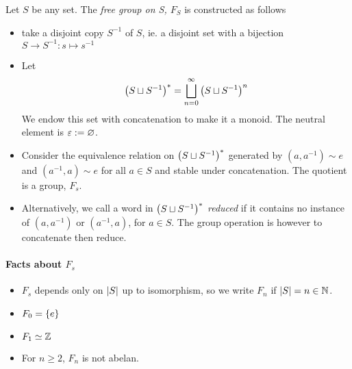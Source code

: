     \begin{definition}
        Let $S$ be any set. The \emph{free group on S, $F_S$} is 
        constructed as follows
        \begin{itemize}
            \item take a disjoint copy $S^{-1}$ of $S$,
                ie. a disjoint set with a bijection $S \to S^{-1}: s \mapsto s^{-1}$
            \item Let \[
                \left(S \sqcup S^{-1}\right)^* = \bigsqcup_{n = 0}^\infty
                    \left(S \sqcup S^{-1}\right)^n
                \]
                We endow this set with concatenation to make it a monoid.
                The neutral element is $\varepsilon := \varnothing$.
            \item Consider the equivalence relation on 
                $\left(S \sqcup S^{-1}\right)^*$ generated by $(a, a^{-1}) \sim e$
                and $(a^{-1}, a) \sim e$
                for all $a \in S$ and stable under concatenation.
                The quotient is a group, $F_s$.
            \item Alternatively, we call a word in $\left(S \sqcup S^{-1}\right)^*$
                \emph{reduced} if it contains no instance of $(a, a^{-1})$ or 
                $(a^{-1}, a)$, for $a \in S$. The group operation is however 
                to concatenate then reduce.
        \end{itemize}
    \end{definition}


    \paragraph{Facts about $F_s$}
    \begin{itemize}
        \item $F_s$ depends only on $\left| S \right|$ up to isomorphism,
            so we write $F_n$ if $\left| S \right| = n \in \mathbb N$.
        \item $F_0 = \left\{ e \right\}$
        \item $F_1 \simeq \mathbb Z$
        \item For $n \geq 2$, $F_n$ is not abelan.
    \end{itemize}

